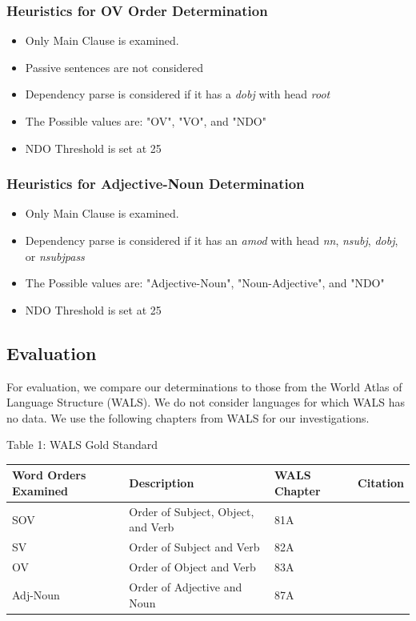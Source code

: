 \documentclass[]{article}
\begin{document}
\subsubsection{Heuristics for OV Order Determination}
\begin{itemize}
    \item Only Main Clause is examined.
    \item Passive sentences are not considered
    \item Dependency parse is considered if it has a \textit{dobj} with head \textit{root}
    \item The Possible values are: "OV", "VO", and "NDO" 
    \item NDO Threshold is set at 25%
\end{itemize}
\subsubsection{Heuristics for Adjective-Noun Determination}
\begin{itemize}
    \item Only Main Clause is examined.
    \item Dependency parse is considered if it has an \textit{amod} with head \textit{nn}, \textit{nsubj}, \textit{dobj}, or \textit{nsubjpass}
    \item The Possible values are: "Adjective-Noun", "Noun-Adjective", and "NDO"
    \item NDO Threshold is set at 25%
\end{itemize}
  
\subsection{Evaluation}
For evaluation, we compare our determinations to those from the World Atlas of Language Structure (WALS).  We do not consider languages for which WALS has no data.  We use the following chapters from WALS for our investigations.  

\begin{center}
Table 1: WALS Gold Standard
\end{center}
\begin{flushleft}
\begin{tabularx}{\textwidth}{|l|X|l|l|}
\hline
  \textbf{Word Orders Examined} & \textbf{Description} & \textbf{WALS Chapter} & \textbf{Citation} \\
\hline
SOV      & Order of Subject, Object, and Verb & 81A & \cite{wals-81}\\
\hline
SV       & Order of Subject and Verb          & 82A & \cite{wals-82}\\
\hline
OV       & Order of Object and Verb           & 83A & \cite{wals-83}\\
\hline
Adj-Noun & Order of Adjective and Noun        & 87A & \cite{wals-87}\\
\hline
\end{tabularx}
\end{flushleft}
\vspace{0.6cm}
\end{document}
